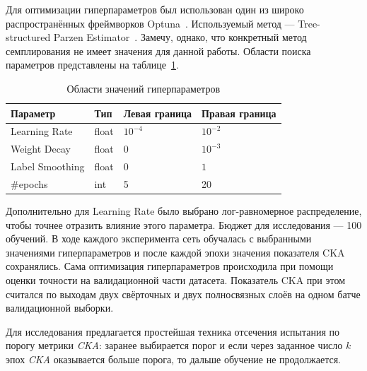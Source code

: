 Для оптимизации гиперпараметров был использован один из широко распространённых фреймворков Optuna~\cite{optuna_2019}.
Используемый метод --- Tree-structured Parzen Estimator~\cite{bergstra2011algorithms}.
Замечу, однако, что конкретный метод семплирования не имеет значения для данной работы.
Области поиска параметров представлены на таблице~\ref{tab:hyp}.
\begin{table}[ht]
    \begin{tabular}{llll}
    Параметр        & Тип   & Левая граница & Правая граница \\ \hline
    Learning Rate   & float & $10^{-4}$     & $10^{-2}$      \\ \hline
    Weight Decay    & float & $0$           & $10^{-3}$      \\ \hline
    Label Smoothing & float & $0$           & $1$            \\ \hline
    \#epochs        & int   & 5             & 20
    \end{tabular}
    \caption{Области значений гиперпараметров}
    \label{tab:hyp}
\end{table}
Дополнительно для Learning Rate было выбрано лог-равномерное распределение, чтобы точнее отразить влияние этого параметра.
Бюджет для исследования --- 100 обучений.
В ходе каждого эксперимента сеть обучалась с выбранными значениями гиперпараметров и после каждой эпохи значения показателя CKA сохранялись.
Сама оптимизация гиперпараметров происходила при помощи оценки точности на валидационной части датасета.
Показатель CKA при этом считался по выходам двух свёрточных и двух полносвязных слоёв на одном батче валидационной выборки.

Для исследования предлагается простейшая техника отсечения испытания по порогу метрики \textit{CKA}: заранее выбирается порог и если через заданное число $k$ эпох \textit{CKA}
оказывается больше порога, то дальше обучение не продолжается.

